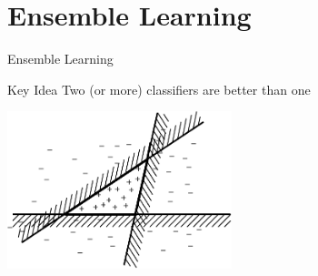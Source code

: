 \documentclass[12pt]{beamer}
\begin{document}
\section{Ensemble Learning}
\begin{frame}{Ensemble Learning}
	\begin{block}{Key Idea}
		Two (or more) classifiers are better than one
	\end{block}
	\begin{center}
		\includegraphics[height=1.8in]{ensemble-expressiveness}
	\end{center}
\end{frame}
\end{document}
